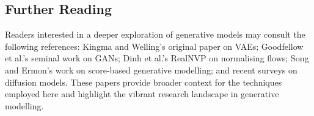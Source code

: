 \subsection{Further Reading}

Readers interested in a deeper exploration of generative models may
consult the following references: Kingma and Welling’s original paper
on VAEs; Goodfellow et al.’s seminal work on GANs; Dinh et al.’s
RealNVP on normalising flows; Song and Ermon’s work on score-based
generative modelling; and recent surveys on diffusion models.  These
papers provide broader context for the techniques employed here and
highlight the vibrant research landscape in generative modelling.
